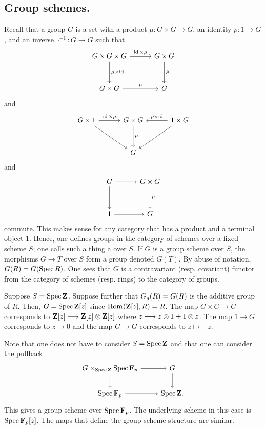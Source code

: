 \documentclass [11 pt, oneside] {article}
\begin{document}
\subsection{Group schemes.}
Recall that a group $G$ is a set with a product $\mu:G\times G\longrightarrow G$, an identity $\rho:1\longrightarrow G$, and an inverse $\cdot ^{-1} : G\longrightarrow G$ such that
\[
\begin{tikzcd}[column sep = 3 em, row sep = 3 em]
	G\times G \times G \ar[r, "\id\times \mu"] \ar[d, "\mu\times \id"] & G\times G\ar[d,"\mu"]\\
	G\times G \ar[r,"\mu"] & G
\end{tikzcd}
\]
and
\[
\begin{tikzcd}[column sep = 3 em, row sep = 3 em]
	G\times 1 \ar[r, "\id\times \rho"]\ar[dr] &G\times G\ar[d, "\mu"]& 1\times G \ar[l, "\rho\times \id", swap] \ar[dl]\\
						  & G
\end{tikzcd}
\]
and
\[
\begin{tikzcd}[column sep = 3 em, row sep = 3 em]
	G\ar[r] \ar[d] & G\times G\ar[d,"\mu"]\\
	1\ar[r] & G
\end{tikzcd}
\]
commute. This makes sense for any category that has a product and a terminal object $1$. 
Hence, one defines groups in the category of schemes over a fixed scheme $S$; one calls such a thing a  over $S$. If $G$ is a group scheme over $S$, the morphisms $G\longrightarrow T$ over $S$ form a group denoted $G(T)$. By abuse of notation, $G(R) = G(\operatorname{Spec} R)$.
One sees that $G$ is a contravariant (resp. covariant) functor from the category of schemes (resp. rings) to the category of groups.

\begin{example}[ ]\label{ga}\text{}
Suppose $S=\operatorname{Spec} \mathbf{Z}$. Suppose further that $G\textsubscript{a}(R)=G(R)$ is the additive group of $R$. 
Then, $G=\operatorname{Spec} \mathbf{Z}[z]$ since $\operatorname{Hom}_{}(\mathbf{Z}[z], R)=R$. The map $G\times G\longrightarrow G$ corresponds to $\mathbf{Z}[z] \longrightarrow \mathbf{Z}[z]\otimes \mathbf{Z}[z]$ where $z\longmapsto z\otimes 1 + 1\otimes z$. The map $1\longrightarrow G$ corresponds to $z\longmapsto 0$ and the map $G\longrightarrow G$ corresponds to $z\longmapsto -z$.

Note that one does not have to consider $S=\operatorname{Spec} \mathbf{Z}$ and that one can consider the pullback
\[
\begin{tikzcd}
	G\times_{\Spec \mathbf{Z}} \Spec \mathbf{F}_{p} \ar[r]\ar[d] & G\ar[d]\\
	\Spec \mathbf{F}_{p} \ar[r] & \Spec \mathbf{Z}.
\end{tikzcd}
\]
This gives a group scheme over $\operatorname{Spec} \mathbf{F}_{p}$. The underlying scheme in this case is $\operatorname{Spec} \mathbf{F}_{p}[z]$. The maps that define the group scheme structure are similar.
\end{example}
\end{document}
